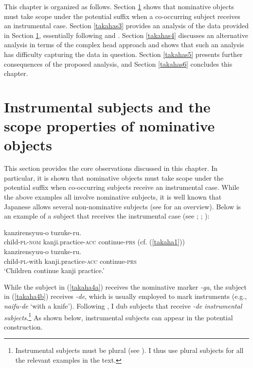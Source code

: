 \documentclass[output=paper]{langscibook}
\begin{document}
This chapter is organized as follows. Section \ref{takahas2} shows that nominative objects must take scope under the potential suffix when a co-occurring subject receives an instrumental case. Section \ref{takahas3} provides an analysis of the data provided in Section \ref{takahas2}, essentially following \citet{Kishimoto2010} and \citet{shimamurawurmbrand2014}. Section \ref{takahas4} discusses an alternative analysis in terms of the complex head approach and shows that such an analysis has difficulty capturing the data in question. Section \ref{takahas5} presents further consequences of the proposed analysis, and Section \ref{takahas6} concludes this chapter.

\section{Instrumental subjects and the scope properties of nominative objects} \label{takahas2}

This section provides the core observations discussed in this chapter. In particular, it is shown that nominative objects must take scope under the potential suffix when co-occurring subjects receive an instrumental case. While the above examples all involve nominative subjects, it is well known that Japanese allows several non-nominative subjects (see \citealt{kishimoto2017case} for an overview). Below is an example of a subject that receives the instrumental case (see \citealt{Kishimoto2005,Kishimoto2010}; \citealt{Takubo1984}; \citealt{Inoue1998}):


\begin{exe}
\ex 
\begin{xlist}

\ex \label{takaha4a}
 {kanzirensyuu-o} {tuzuke-ru.}\\
	child-\textsc{pl}-\textsc{nom}  kanji.practice-\textsc{acc} continue-\textsc{prs} (cf. (\ref{takaha1}))\\ 
	
\ex \label{takaha4b}
 {kanzirensyuu-o} {tuzuke-ru.}\\
	child-\textsc{pl}-with       kanji.practice-\textsc{acc} continue-\textsc{prs}\\
\glt `Children continue kanji practice.' \\
\end{xlist}


\end{exe}

While the subject in (\ref{takaha4a}) receives the nominative marker \emph{-ga}, the subject in (\ref{takaha4b}) receives \emph{-de}, which is usually employed to mark instruments (e.g., \emph{naifu-de} `with a knife’). Following \citet{Kishimoto2005,Kishimoto2010}, I dub subjects that receive \emph{-de instrumental subjects}.\footnote{Instrumental subjects must be plural (see \citealt{Takubo1984, Kishimoto2005, Kishimoto2010}). I thus use plural subjects for all the relevant examples in the text.} As shown below, instrumental subjects can appear in the potential construction.
\end{document}
